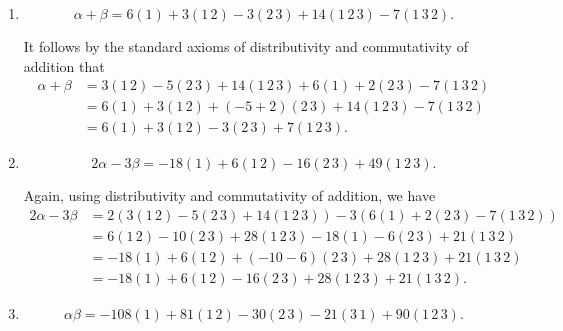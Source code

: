 \documentclass[12 pt, letterpaper]{hmcpset}
\begin{document}
\begin{solution}
	\begin{enumerate}
		\item
			\[
				\boxed{
					\alpha + \beta = 6 (1) + 3 (1 \, 2) - 3 (2 \, 3) + 14 (1 \, 2 \, 3) - 7 (1 \, 3 \, 2).
				}
			\] 

			It follows by the standard axioms of distributivity and commutativity of addition that
			\[
				\begin{split}
					\alpha + \beta & = 3 (1 \, 2) - 5 (2 \, 3) + 14 (1 \, 2 \, 3) + 6 (1) + 2 (2 \, 3) - 7 (1 \, 3 \, 2) \\
						       & = 6 (1) + 3 (1 \, 2) + (-5 + 2)(2 \, 3) + 14 (1 \, 2 \, 3) - 7 (1 \, 3 \, 2) \\
						       & = 6 (1) + 3(1 \, 2) - 3(2 \, 3) + 7(1 \, 2 \, 3).
				\end{split}
			\]
		\item
			\[
				\boxed{
					2 \alpha - 3 \beta = -18 (1) + 6 (1 \, 2) - 16 (2 \, 3) + 49 (1 \, 2 \, 3).
				}
			\] 

			Again, using distributivity and commutativity of addition, we have
			\[
				\begin{split}
					2 \alpha - 3 \beta & = 2(3 (1 \, 2) - 5 (2 \, 3) + 14 (1 \, 2 \, 3)) - 3(6 (1) + 2 (2 \, 3) - 7 (1 \, 3 \, 2)) \\
							   & = 6 (1 \, 2) - 10(2 \, 3) + 28 (1 \, 2 \, 3)- 18 (1) - 6(2 \, 3) + 21(1 \, 3 \, 2) \\
							   & = -18 (1) + 6 (1 \, 2) + (-10 - 6)(2 \, 3) + 28 (1 \, 2 \, 3) + 21 (1 \, 3 \, 2) \\
							   & = -18 (1) + 6(1 \, 2) -16 (2 \, 3) + 28 (1 \, 2 \, 3) + 21 (1 \, 3 \, 2).
				\end{split}
			\]
		\item
			\[
				\boxed{
					\alpha \beta = -108 (1) + 81 (1 \, 2) - 30 (2 \, 3) - 21 (3 \, 1) + 90 (1 \, 2 \, 3).
				}
			\] 


\end{enumerate}
\end{solution}
\end{document}
